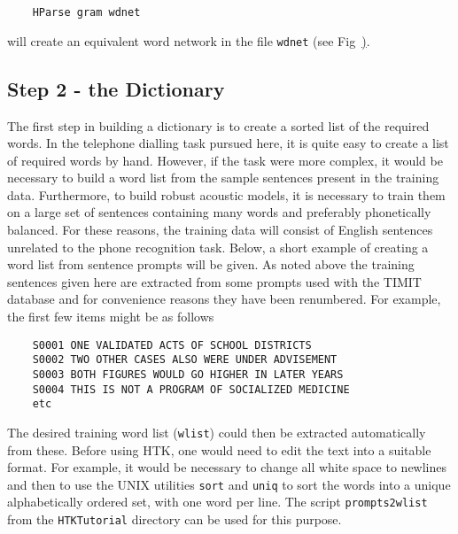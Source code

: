 
\begin{verbatim}
    HParse gram wdnet
\end{verbatim}
will create an equivalent word network in 
the file \texttt{wdnet} (see Fig~\href{f:step1}).


\subsection{Step 2 - the Dictionary}

The first step in building a dictionary is to create a sorted list of the
required words. 
In the telephone dialling task pursued here, it is quite easy to create a list
of required words by hand. However, if the task were more complex, it would be
necessary to build a word list from the sample sentences present in the training
data. Furthermore, to build robust acoustic models, it is necessary to train
them on a large set of sentences containing many words and preferably
phonetically balanced. For these reasons, the training data will consist of
English sentences unrelated to the phone recognition task. Below, a short
example of creating a word list from sentence prompts will be given. As noted
above the training sentences given here are extracted from some prompts used
with the TIMIT database and for convenience reasons they 
have been renumbered. For example, the first few items might be as follows
\vspace{1cm}
\begin{verbatim}
    S0001 ONE VALIDATED ACTS OF SCHOOL DISTRICTS
    S0002 TWO OTHER CASES ALSO WERE UNDER ADVISEMENT
    S0003 BOTH FIGURES WOULD GO HIGHER IN LATER YEARS
    S0004 THIS IS NOT A PROGRAM OF SOCIALIZED MEDICINE
    etc
\end{verbatim}
The desired training word list (\texttt{wlist}) could then be
extracted automatically from these.  Before using HTK, one would need to edit
the text into a suitable format.  For example, it would be necessary to change
all white space to newlines and then to use the UNIX utilities \texttt{sort}
and \texttt{uniq} to sort the words into a unique alphabetically ordered set,
with one word per line.  The script \texttt{prompts2wlist} from the
\texttt{HTKTutorial} directory can be used for this purpose.

